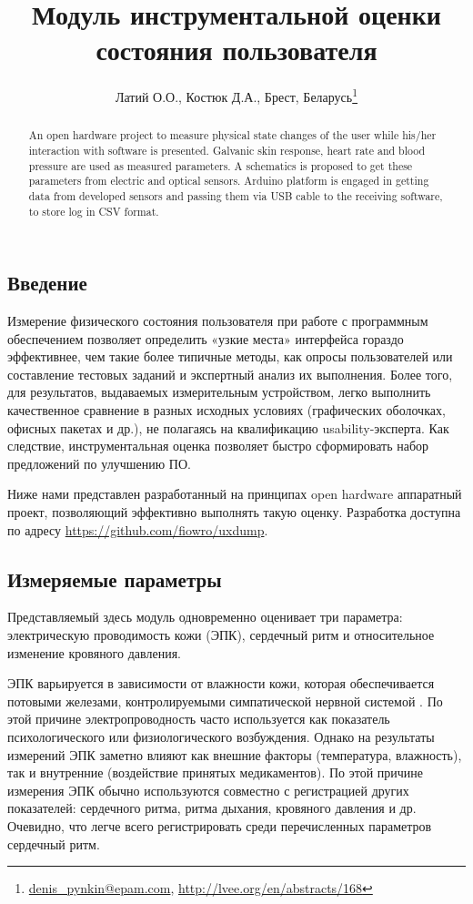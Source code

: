 \documentclass[10pt, a5paper]{article}
\begin{document}
\title{Модуль инструментальной оценки состояния пользователя}
\author{Латий О.О., Костюк Д.А., Брест, Беларусь\footnote{\url{denis_pynkin@epam.com}, \url{http://lvee.org/en/abstracts/168}}}
\maketitle
\begin{abstract}
An open hardware project to measure physical state changes of the user while his/her interaction with software is presented. Galvanic skin response, heart rate and blood pressure are used as measured parameters. A schematics is proposed to get these parameters from electric and optical sensors. Arduino platform is engaged in getting data from developed sensors and passing them via USB cable to the receiving software, to store log in CSV format.
\end{abstract}
\subsection*{Введение}

Измерение физического состояния пользователя при работе с программным обеспечением позволяет определить «узкие места» интерфейса гораздо эффективнее, чем такие более типичные методы, как опросы пользователей или составление тестовых заданий и экспертный анализ их выполнения. Более того, для результатов, выдаваемых измерительным устройством, легко выполнить качественное сравнение в разных исходных условиях (графических оболочках, офисных пакетах и др.), не полагаясь на квалификацию usability-эксперта.  Как следствие, инструментальная оценка позволяет быстро сформировать набор предложений по улучшению ПО.

Ниже нами представлен разработанный на принципах open \linebreak hardware аппаратный проект, позволяющий эффективно выполнять такую оценку. Разработка доступна по адресу \url{https://github.com/fiowro/uxdump}.

\subsection*{Измеряемые параметры}

Представляемый здесь модуль одновременно оценивает три параметра: электрическую проводимость кожи (ЭПК), сердечный \linebreak ритм и относительное изменение кровяного давления.

ЭПК варьируется в зависимости от влажности кожи, которая обеспечивается потовыми железами, контролируемыми симпатической нервной системой \cite{bib1, bib2}. По этой причине электропроводность часто используется как показатель психологического или физиологического возбуждения. Однако на результаты измерений ЭПК заметно влияют как внешние факторы (температура, влажность), так и внутренние (воздействие принятых медикаментов). По этой причине измерения ЭПК обычно используются совместно с регистрацией других показателей: сердечного ритма, ритма дыхания, кровяного давления и др. Очевидно, что легче всего регистрировать среди перечисленных параметров сердечный ритм.
\end{document}
